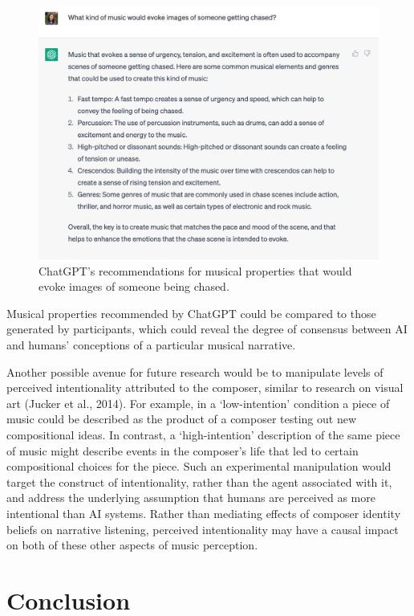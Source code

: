 \documentclass[12pt,twoside]{reedthesis}
\begin{document}
\begin{figure}[h!tbp]
	\centering
	\includegraphics[scale=0.6]{chatgpt.png}
	\caption{ChatGPT's recommendations for musical properties that would evoke images of someone being chased.}
	\label{fig-chatgpt}
\end{figure}

Musical properties recommended by ChatGPT could be compared to those generated by participants, which could reveal the degree of consensus between AI and humans' conceptions of a particular musical narrative. 

Another possible avenue for future research would be to manipulate levels of perceived intentionality attributed to the composer, similar to research on visual art (Jucker et al., 2014). For example, in a ‘low-intention’ condition a piece of music could be described as the product of a composer testing out new compositional ideas. In contrast, a ‘high-intention’ description of the same piece of music might describe events in the composer’s life that led to certain compositional choices for the piece. Such an experimental manipulation would target the construct of intentionality, rather than the agent associated with it, and address the underlying assumption that humans are perceived as more intentional than AI systems. Rather than mediating effects of composer identity beliefs on narrative listening, perceived intentionality may have a causal impact on both of these other aspects of music perception.

\section*{Conclusion}
\end{document}
